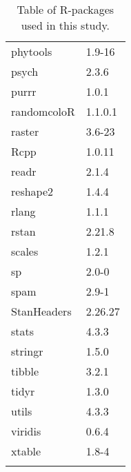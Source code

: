 \begin{longtable}{p{2.5cm}p{2.5cm}}
  phytools & 1.9-16 \\ 
  psych & 2.3.6 \\ 
  purrr & 1.0.1 \\ 
  randomcoloR & 1.1.0.1 \\ 
  raster & 3.6-23 \\ 
  Rcpp & 1.0.11 \\ 
  readr & 2.1.4 \\ 
  reshape2 & 1.4.4 \\ 
  rlang & 1.1.1 \\ 
  rstan & 2.21.8 \\ 
  scales & 1.2.1 \\ 
  sp & 2.0-0 \\ 
  spam & 2.9-1 \\ 
  StanHeaders & 2.26.27 \\ 
  stats & 4.3.3 \\ 
  stringr & 1.5.0 \\ 
  tibble & 3.2.1 \\ 
  tidyr & 1.3.0 \\ 
  utils & 4.3.3 \\ 
  viridis & 0.6.4 \\ 
  xtable & 1.8-4 \\ 
   \bottomrule
\caption{Table of R-packages used in this study.} 
\label{appendix_r_package_table}
\end{longtable}

